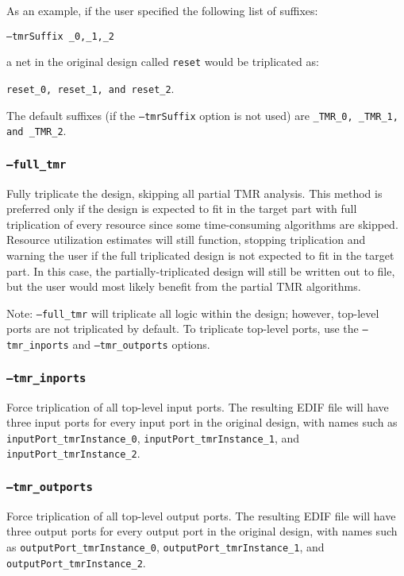 \documentclass[english]{article}
\begin{document}
As an example, if the user specified the following list of suffixes:

\texttt{--tmrSuffix \_0,\_1,\_2}

a net in the original design called \texttt{reset} would be triplicated as:

\texttt{reset\_0, reset\_1, and reset\_2}.

The default suffixes (if the \texttt{--tmrSuffix} option is not used) are 
\texttt{\_TMR\_0, \_TMR\_1, and \_TMR\_2}.

\subsubsection{\texttt{--full\_tmr}}
Fully triplicate the design, skipping all partial TMR analysis. This method is 
preferred only if the design is expected to fit in the target part with full 
triplication of every resource since some time-consuming algorithms are skipped.
Resource utilization estimates will still function, stopping triplication and 
warning the user if the full triplicated design is not expected to fit in the 
target part. In this case, the partially-triplicated design will still be 
written out to file, but the user would most likely benefit from the partial 
TMR algorithms.

Note: \texttt{--full\_tmr} will triplicate all logic within the design; however, 
top-level ports are not triplicated by default. To triplicate top-level ports,
use the \texttt{--tmr\_in\-ports} and \texttt{--tmr\_outports} options.

\subsubsection{\texttt{--tmr\_inports}}
Force triplication of all top-level input ports. The resulting EDIF file will
have three input ports for every input port in the original design, with names
such as \texttt{inputPort\_tmrInstance\_0}, \texttt{inputPort\_tmrInstance\_1},
and \texttt{inputPort\_tmrInstance\_2}.

\subsubsection{\texttt{--tmr\_outports}}
Force triplication of all top-level output ports. The resulting EDIF file will
have three output ports for every output port in the original design, with names 
such as \texttt{outputPort\_tmrInstance\_0}, 
\texttt{output\-Port\_tmr\-Instance\_1}, and 
\texttt{outputPort\_tmrInstance\_2}.
\end{document}
